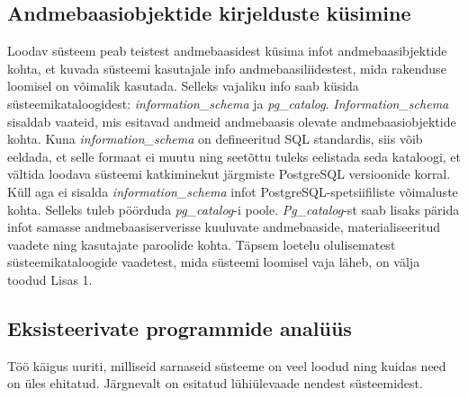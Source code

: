 \documentclass[a4paper,12pt]{article} %
\begin{document}
\subsection{Andmebaasiobjektide kirjelduste küsimine}
\label{andmebaasi_objektide_kirjelduste_küsimine}
Loodav süsteem peab teistest andmebaasidest küsima infot andmebaasibjektide kohta, et kuvada süsteemi kasutajale info andmebaasiliidestest, mida rakenduse loomisel on võimalik kasutada. Selleks vajaliku info saab küsida süsteemikataloogidest: \textit{information\_schema} ja \textit{pg\_catalog}.
\textit{Information\_schema} sisaldab vaateid, mis esitavad andmeid andmebaasis olevate andmebaasiobjektide kohta. Kuna \textit{information\_schema} on defineeritud SQL standardis, siis võib eeldada, et selle formaat ei muutu ning seetõttu tuleks eelistada seda kataloogi, et vältida loodava süsteemi katkiminekut  järgmiste PostgreSQL versioonide korral. \cite{PostgreSQLInformationSchema} Küll aga ei sisalda \textit{information\_schema} infot PostgreSQL-spetsiifiliste võimaluste kohta. Selleks tuleb pöörduda \textit{pg\_catalog}-i poole. \textit{Pg\_catalog}-st saab lisaks pärida infot samasse andmebaasiserverisse kuuluvate andmebaaside, materialiseeritud vaadete ning kasutajate paroolide kohta. \cite{PostgreSQLSystemCatalogs} Täpsem loetelu olulisematest süsteemikataloogide vaadetest, mida süsteemi loomisel vaja läheb, on välja toodud Lisas 1.

\subsection{Eksisteerivate programmide analüüs}
Töö käigus uuriti, milliseid sarnaseid süsteeme on veel loodud ning kuidas need on üles ehitatud. Järgnevalt on esitatud lühiülevaade nendest süsteemidest.
\end{document}
